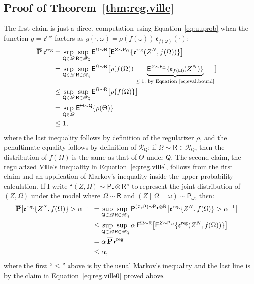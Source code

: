 \documentclass[a4paper, 12pt]{article}
\theoremstyle{plain}
\theoremstyle{definition}
\theoremstyle{remark}
\newcommand{\prob}{\mathsf{P}}
\newcommand{\E}{\mathsf{E}}
\newcommand{\prior}{\mathsf{Q}}
\newcommand{\credal}{\mathscr{Q}}
\newcommand{\pbcred}{\mathscr{R}}
\newcommand{\pb}{\mathsf{R}}
\newcommand{\uuprob}{\mathbf{\overline{P}}}
\newcommand{\eval}{\mathfrak{e}}
\begin{document}
\subsection{Proof of Theorem~\ref{thm:reg.ville}} 

The first claim is just a direct computation using Equation~\eqref{eq:uuprob} when the function $g = \eval^\text{reg}$ factors as $g(\cdot, \omega) = \rho(f(\omega)) \, \eval_{f(\omega)}(\cdot)$:
\begin{align*}
\uuprob \, \eval^\text{reg} & = \sup_{\prior \in \credal} \sup_{\pb \in \pbcred_\prior} \E^{\Omega \sim \pb} \bigl[ \E^{Z \sim \prob_\Omega}\{ \eval^\text{reg}(Z^N, f(\Omega)) \} \bigr] \\
& = \sup_{\prior \in \credal} \sup_{\pb \in \pbcred_\prior} \E^{\Omega \sim \pb} \bigl[ \rho( f(\Omega) ) \,  \underbrace{\E^{Z \sim \prob_\Omega}\{ \eval_{f(\Omega)}(Z^N) \}}_{\text{$\leq 1$, by Equation \eqref{eq:eval.bound}}} \bigr] \\
& \leq \sup_{\prior \in \credal} \sup_{\pb \in \pbcred_\prior} \E^{\Omega \sim \pb} \bigl[ \rho\{ f(\Omega) \} \bigr] \\
& = \sup_{\prior \in \credal} \E^{\Theta \sim \prior} \{ \rho(\Theta) \} \\
& \leq 1,
\end{align*}
where the last inequality follows by definition of the regularizer $\rho$, and the penultimate equality follows by definition of $\pbcred_\prior$: if $\Omega \sim \pb \in \pbcred_\prior$, then the distribution of $f(\Omega)$ is the same as that of $\Theta$ under $\prior$.  The second claim, the regularized Ville's inequality in Equation~\eqref{eq:reg.ville}, follows from the first claim and an application of Markov's inequality inside the upper-probability calculation.  If I write ``$(Z,\Omega) \sim \prob_\bullet \otimes \pb$'' to represent the joint distribution of $(Z,\Omega)$ under the model where $\Omega \sim \pb$ and $(Z \mid \Omega=\omega) \sim \prob_\omega$, then:
\begin{align*}
\uuprob \bigl[ \eval^\text{\rm reg}\{Z^N, f(\Omega)\} > \alpha^{-1} \bigr] & = \sup_{\prior \in \credal} \sup_{\pb \in \pbcred_\prior} \prob^{(Z,\Omega) \sim \prob_\bullet \otimes \pb}\bigl[ \eval^\text{reg}\{Z^N, f(\Omega) \} > \alpha^{-1} \bigr] \\
& \leq \sup_{\prior \in \credal} \sup_{\pb \in \pbcred_\prior} \alpha \, \E^{\Omega \sim \pb} \bigl[ \E^{Z \sim \prob_\Omega}\{ \eval^\text{reg}(Z^N, f(\Omega)) \} \bigr] \\
& = \alpha \, \uuprob \, \eval^\text{reg} \\
& \leq \alpha,
\end{align*}
where the first ``$\leq$'' above is by the usual Markov's inequality and the last line is by the claim in Equation~\eqref{eq:reg.ville0} proved above.  
\end{document}
